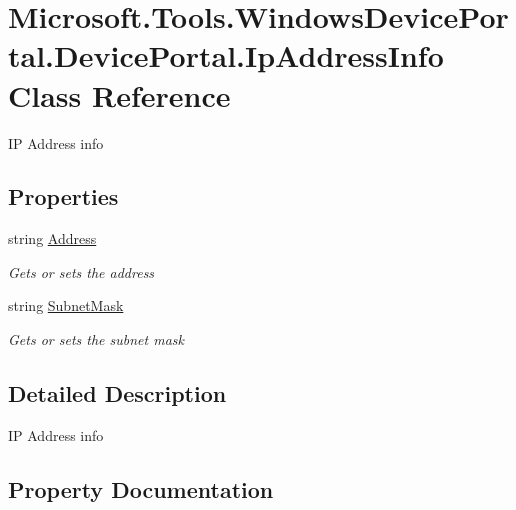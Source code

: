 \hypertarget{class_microsoft_1_1_tools_1_1_windows_device_portal_1_1_device_portal_1_1_ip_address_info}{}\section{Microsoft.\+Tools.\+Windows\+Device\+Portal.\+Device\+Portal.\+Ip\+Address\+Info Class Reference}
\label{class_microsoft_1_1_tools_1_1_windows_device_portal_1_1_device_portal_1_1_ip_address_info}


IP Address info  


\subsection*{Properties}
\begin{DoxyCompactItemize}
\item 
string \hyperlink{class_microsoft_1_1_tools_1_1_windows_device_portal_1_1_device_portal_1_1_ip_address_info_a15236608f9b820b20dd163eeb55fceb5}{Address}
\begin{DoxyCompactList}\small\item\em Gets or sets the address \end{DoxyCompactList}\item 
string \hyperlink{class_microsoft_1_1_tools_1_1_windows_device_portal_1_1_device_portal_1_1_ip_address_info_af4d4bc919dcd543d7835c40880aa8133}{Subnet\+Mask}
\begin{DoxyCompactList}\small\item\em Gets or sets the subnet mask \end{DoxyCompactList}\end{DoxyCompactItemize}


\subsection{Detailed Description}
IP Address info 



\subsection{Property Documentation}

